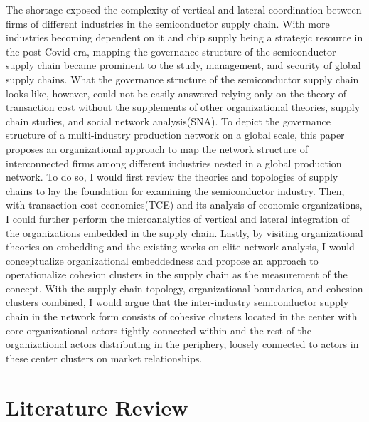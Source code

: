 \documentclass[12pt]{article}
\begin{document}
\indent The shortage exposed the complexity of vertical and lateral coordination between firms of different industries in the semiconductor supply chain. With more industries becoming dependent on it and chip supply being a strategic resource in the post-Covid era, mapping the governance structure of the semiconductor supply chain became prominent to the study, management, and security of global supply chains. What the governance structure of the semiconductor supply chain looks like, however, could not be easily answered relying only on the theory of transaction cost without the supplements of other organizational theories, supply chain studies, and social network analysis(SNA). To depict the governance structure of a multi-industry production network on a global scale, this paper proposes an organizational approach to map the network structure of interconnected firms among different industries nested in a global production network. To do so, I would first review the theories and topologies of supply chains to lay the foundation for examining the semiconductor industry. Then, with transaction cost economics(TCE) and its analysis of economic organizations, I could further perform the microanalytics of vertical and lateral integration of the organizations embedded in the supply chain. Lastly, by visiting organizational theories on embedding and the existing works on elite network analysis, I would conceptualize organizational embeddedness and propose an approach to operationalize cohesion clusters in the supply chain as the measurement of the concept. With the supply chain topology, organizational boundaries, and cohesion clusters combined, I would argue that the inter-industry semiconductor supply chain in the network form consists of cohesive clusters located in the center with core organizational actors tightly connected within and the rest of the organizational actors distributing in the periphery, loosely connected to actors in these center clusters on market relationships.

\section*{\centering Literature Review}
\end{document}
